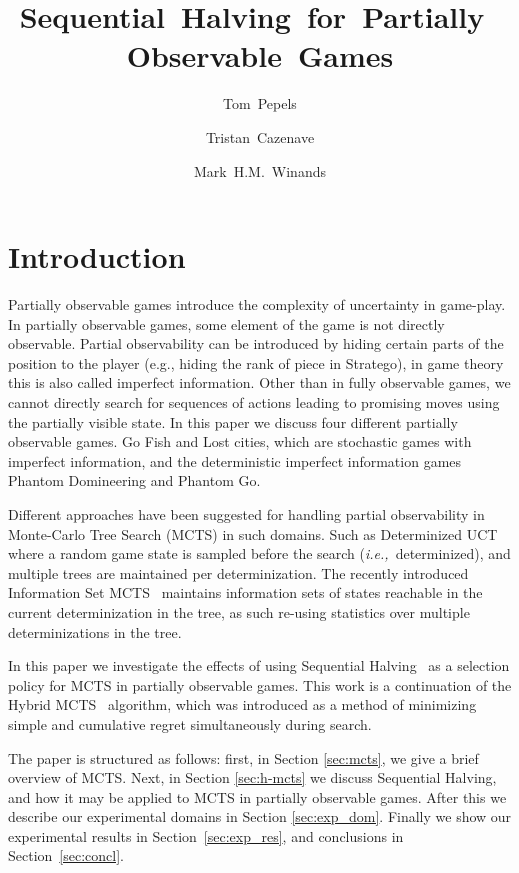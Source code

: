 \documentclass[a4paper]{llncs}
\title{Sequential~Halving~for~Partially~Observable~Games}
\author{Tom~Pepels\inst{1} \and Tristan~Cazenave\inst{2} \and Mark~H.M.~Winands\inst{1}}
\institute{Department of Knowledge Engineering,  Maastricht University\\ \email{\{tom.pepels,m.winands\}@maastrichtuniversity.nl} \and LAMSADE - Université Paris-Dauphine \\ \email{cazenave@lamsade.dauphine.fr}}
\newcommand{\ie}{{\it i.e.,}~}
\begin{document}
\maketitle

\begin{abstract} 

\end{abstract}

\section{Introduction}
\label{sec:intro}

Partially observable games introduce the complexity of uncertainty in game-play. In partially observable games, some element of the game is not directly observable. Partial observability can be introduced by hiding certain parts of the  position to the player (e.g., hiding the rank of piece in Stratego), in game theory this is also called imperfect information. Other than in fully observable games, we cannot directly search for sequences of actions leading to promising moves using the partially visible state. In this paper we discuss four different partially observable games. Go Fish and Lost cities, which are stochastic games with imperfect information, and the deterministic imperfect information games Phantom Domineering and Phantom Go.

Different approaches have been suggested for handling partial observability in Monte-Carlo Tree Search (MCTS) in such domains. Such as Determinized UCT~\cite{ginsberg99} where a random game state is sampled before the search (\ie determinized), and multiple trees are maintained per determinization. The recently introduced Information Set MCTS~\cite{cowling2012} maintains information sets of states reachable in the current determinization in the tree, as such re-using statistics over multiple determinizations in the tree.

In this paper we investigate the effects of using Sequential Halving~\cite{Karnin13SH} as a selection policy for MCTS in partially observable games. This work is a continuation of the Hybrid MCTS~\cite{Pepels14hmcts} algorithm, which was introduced as a method of minimizing simple and cumulative regret simultaneously during search.

The paper is structured as follows: first, in Section \ref{sec:mcts}, we give a brief overview of MCTS. Next, in Section \ref{sec:h-mcts} we discuss Sequential Halving, and how it may be applied to MCTS in partially observable games. After this we describe our experimental domains in Section \ref{sec:exp_dom}. Finally we show our experimental results in Section~\ref{sec:exp_res}, and conclusions in Section~\ref{sec:concl}.
\end{document}
